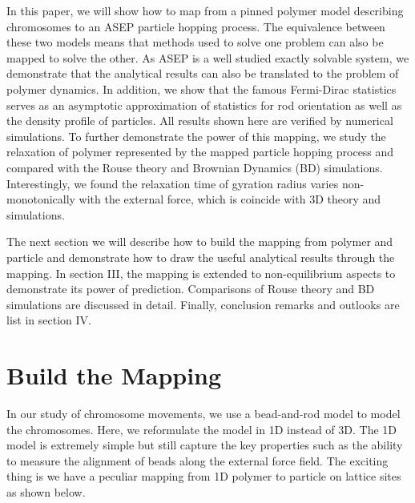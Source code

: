 \documentclass[aps,showpacs,twocolumn,floatfix,prx,superscriptaddress]{revtex4-1}
\begin{document}
In this paper, we will show how to map from a pinned polymer model describing
chromosomes to an ASEP particle hopping process. The equivalence between these
two models means that methods used to solve one problem can also be mapped to
solve the other. As ASEP is a well studied exactly solvable system, we
demonstrate that the analytical results can also be translated to the problem of
polymer dynamics. In addition, we show that the famous Fermi-Dirac statistics
serves as an asymptotic approximation of statistics for rod orientation as well
as the density profile of particles. All results shown here are verified by
numerical simulations. To further demonstrate the power of this mapping, we
study the relaxation of polymer represented by the mapped particle hopping
process and compared with the Rouse theory and Brownian Dynamics (BD)
simulations.  Interestingly, we found the relaxation time of gyration radius
varies non-monotonically with the external force, which is coincide with 3D
theory and simulations.

The next section we will describe how to build the mapping from polymer and
particle and demonstrate how to draw the useful analytical results through the
mapping. In section III, the mapping is extended to non-equilibrium aspects to
demonstrate its power of prediction. Comparisons of Rouse theory and BD
simulations are discussed in detail. Finally, conclusion remarks and outlooks
are list in section IV. 


\section{Build the Mapping}
In our study of chromosome movements, we use a bead-and-rod model to model the
chromosomes. Here, we reformulate the model in 1D instead of 3D. The 1D model
is extremely simple but still capture the key properties such as the ability to
measure the  alignment of beads along the external force field.  The exciting
thing is we have a peculiar mapping from 1D polymer to particle on lattice sites
as shown below.  
\end{document}
